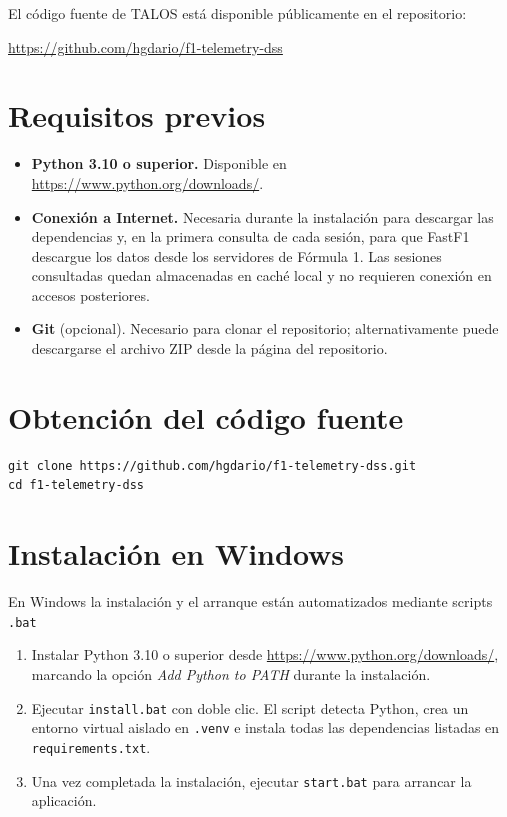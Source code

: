 \documentclass[12pt,a4paper,twoside,openright]{book}
\begin{document}
\begin{umaappendices}

\label{app:instalacion}
El código fuente de TALOS está disponible públicamente en el repositorio:
\begin{center}
\url{https://github.com/hgdario/f1-telemetry-dss}
\end{center}

\section{Requisitos previos}
\begin{itemize}
  \item \textbf{Python 3.10 o superior.} Disponible en \url{https://www.python.org/downloads/}.
  \item \textbf{Conexión a Internet.} Necesaria durante la instalación para descargar las dependencias y, en la primera consulta de cada sesión, para que FastF1 descargue los datos desde los servidores de Fórmula 1. Las sesiones consultadas quedan almacenadas en caché local y no requieren conexión en accesos posteriores.
  \item \textbf{Git} (opcional). Necesario para clonar el repositorio; alternativamente puede descargarse el archivo ZIP desde la página del repositorio.
\end{itemize}

\section{Obtención del código fuente}
\begin{lstlisting}[style=bash, caption={Clonado del repositorio}, label={lst:clone}]
git clone https://github.com/hgdario/f1-telemetry-dss.git
cd f1-telemetry-dss
\end{lstlisting}

\section{Instalación en Windows}
En Windows la instalación y el arranque están automatizados mediante scripts \texttt{.bat}

\begin{enumerate}
  \item Instalar Python 3.10 o superior desde \url{https://www.python.org/downloads/}, marcando la opción \textit{Add Python to PATH} durante la instalación.
  \item Ejecutar \texttt{install.bat} con doble clic. El script detecta Python, crea un entorno virtual aislado en \texttt{.venv} e instala todas las dependencias listadas en \texttt{requirements.txt}.
  \item Una vez completada la instalación, ejecutar \texttt{start.bat} para arrancar la aplicación.
\end{enumerate}


\end{umaappendices}
\end{document}
